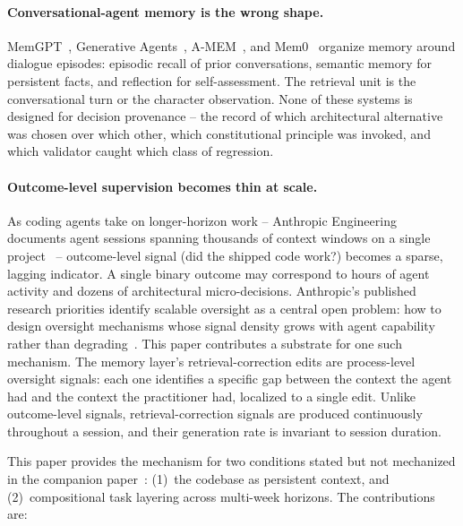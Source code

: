 \documentclass[11pt]{article}
\begin{document}
\paragraph{Conversational-agent memory is the wrong shape.}
MemGPT~\citep{packer2023memgpt}, Generative Agents~\citep{park2023generative}, A-MEM~\citep{xu2024amem}, and Mem0~\citep{chhikara2025mem0} organize memory around dialogue episodes: episodic recall of prior conversations, semantic memory for persistent facts, and reflection for self-assessment.
The retrieval unit is the conversational turn or the character observation.
None of these systems is designed for decision provenance -- the record of which architectural alternative was chosen over which other, which constitutional principle was invoked, and which validator caught which class of regression.

\paragraph{Outcome-level supervision becomes thin at scale.}
As coding agents take on longer-horizon work -- Anthropic Engineering documents agent sessions spanning thousands of context windows on a single project~\citep{anthropic2026harnesses} -- outcome-level signal (did the shipped code work?) becomes a sparse, lagging indicator.
A single binary outcome may correspond to hours of agent activity and dozens of architectural micro-decisions.
Anthropic's published research priorities identify scalable oversight as a central open problem: how to design oversight mechanisms whose signal density grows with agent capability rather than degrading~\citep{anthropic2025recommended}.
This paper contributes a substrate for one such mechanism.
The memory layer's retrieval-correction edits are process-level oversight signals: each one identifies a specific gap between the context the agent had and the context the practitioner had, localized to a single edit.
Unlike outcome-level signals, retrieval-correction signals are produced continuously throughout a session, and their generation rate is invariant to session duration.

\medskip

This paper provides the mechanism for two conditions stated but not mechanized in the companion paper~\citep[\S2]{ovcharov2026recursive}: (1)~the codebase as persistent context, and (2)~compositional task layering across multi-week horizons.
The contributions are:
\end{document}
